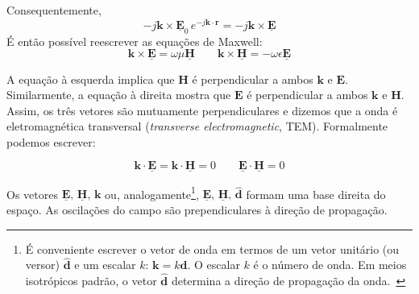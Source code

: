 \noindent Consequentemente,
\begin{equation}
     \boxed{-j\mathbf{k}\times\underline{\mathbf{E}}_0\,e^{-j\mathbf{k}\cdot \mathbf{r}} = -j\mathbf{k}\times\mathbf{\underline{E}}}
\end{equation}
É então possível reescrever as equações de Maxwell:
\begin{equation}\label{eq:Max-k}
    \boxed{\mathbf{k}\times\mathbf{\underline{E}} =\omega\mu\mathbf{\underline{H}}\qquad
    \mathbf{k}\times\mathbf{\underline{H}} = -\omega\epsilon\mathbf{\underline{E}}}
\end{equation}
\begin{check}
    A equação à esquerda implica que $\mathbf{H}$ é perpendicular a ambos $\mathbf{k}$ e $\mathbf{E}$. Similarmente, a equação à direita mostra que $\mathbf{E}$ é perpendicular a ambos $\mathbf{k}$ e $\mathbf{H}$. Assim, os três vetores são mutuamente perpendiculares e dizemos que a onda é eletromagnética transversal (\textit{transverse electromagnetic}, TEM). Formalmente podemos escrever:

    \begin{equation}
        \mathbf{k}\cdot\mathbf{\underline{E}} = \mathbf{k}\cdot\mathbf{\underline{H}} = 0\qquad\mathbf{\underline{E}}\cdot\mathbf{\underline{H}} = 0
    \end{equation}
\end{check}
Os vetores $\mathbf{\underline{E}},\, \mathbf{\underline{H}},\, \mathbf{k}$ ou, analogamente\footnote{É conveniente escrever o vetor de onda em termos de um vetor unitário (ou versor) $\mathbf{\hat{d}}$ e um escalar $k$: $\mathbf{k} = k\mathbf{\hat{d}}.$ O escalar $k$ é o número de onda. Em meios isotrópicos padrão, o vetor $\mathbf{\hat{d}}$ determina a direção de propagação da onda.~\cite{silveirinha2023}}, $\mathbf{\underline{E}},\, \mathbf{\underline{H}},\, \mathbf{\hat{d}}$ formam uma base direita do espaço. As oscilações do campo são prependiculares à direção de propagação.

